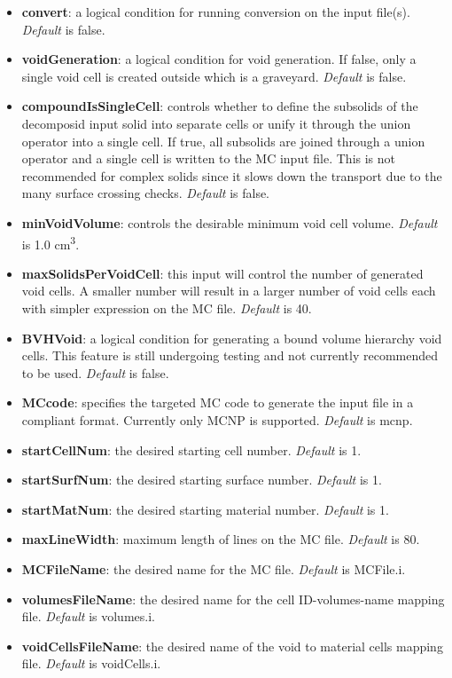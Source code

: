 \documentclass[12pt, a4paper, titlepage]{article}
\begin{document}
	\begin{itemize}
	  \item \textbf{convert}: a logical condition for running conversion on the input file(s). \emph{Default} is false.
	  \item \textbf{voidGeneration}: a logical condition for void generation. If false, only a single void cell is created outside which is a graveyard. \emph{Default} is false.
	  \item \textbf{compoundIsSingleCell}: controls whether to define the subsolids of the decomposid input solid into separate cells or unify it through the union operator into a single cell. If true, all subsolids are joined  through a union operator and a single cell is written to the MC input file. This is not recommended for complex solids since it slows down the transport due to the many surface crossing checks. \emph{Default} is false.
	  \item \textbf{minVoidVolume}: controls the desirable minimum void cell volume. \emph{Default} is 1.0 cm\textsuperscript{3}.
	  \item \textbf{maxSolidsPerVoidCell}: this input will control the number of generated void cells. A smaller number will result in a larger number of void cells each with simpler expression on the MC file. \emph{Default} is 40.
	  \item \textbf{BVHVoid}: a logical condition for generating a bound volume hierarchy void cells. This feature is still undergoing testing and not currently recommended to be used. \emph{Default} is false.
	  \item \textbf{MCcode}: specifies the targeted MC code to generate the input file in a compliant format. Currently only MCNP is supported. \emph{Default} is mcnp.
	  \item \textbf{startCellNum}: the desired starting cell number. \emph{Default} is 1.
	  \item \textbf{startSurfNum}: the desired starting surface number. \emph{Default} is 1.
	  \item \textbf{startMatNum}: the desired starting material number. \emph{Default} is 1.
	  \item \textbf{maxLineWidth}: maximum length of lines on the MC file. \emph{Default} is 80.
	  \item \textbf{MCFileName}: the desired name for the MC file. \emph{Default} is MCFile.i.
	  \item \textbf{volumesFileName}: the desired name for the cell ID-volumes-name mapping file. \emph{Default} is volumes.i.
	  \item \textbf{voidCellsFileName}: the desired name of the void to material cells mapping file. \emph{Default} is voidCells.i.
    \end{itemize}
\end{document}
